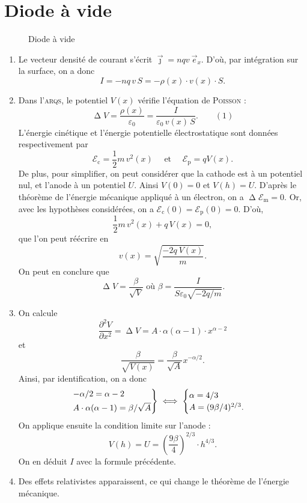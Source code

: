 \section{Diode à vide}

\begin{figure}[H]
	\centering
	
	\caption{Diode à vide}
\end{figure}

\begin{enumerate}
	\item Le vecteur densité de courant s'écrit $\vec{\jmath} = n q v\: \vec{e}_x$. D'où, par intégration sur la surface, on a donc \[
			I =  -nq\, v\, S = -\rho(x) \cdot v(x) \cdot S
		.\]
	\item Dans l'\textsc{arqs}, le potentiel $V(x)$ vérifie l'équation de \textsc{Poisson} : \[
			\upDelta V = \frac{\rho(x)}{\varepsilon_0} = \frac{I}{\varepsilon_0\, v(x)\, S}.\quad\quad(1)
		\] L'énergie cinétique et l'énergie potentielle électrostatique sont données respectivement par \[
			\mathcal{E}_\mathrm{c}  = \frac{1}{2} m \,v^2(x) \quad \text{ et } \quad \mathcal{E}_\mathrm{p} = q V(x)	
		.\]
		De plus, pour simplifier, on peut considérer que la cathode est à un potentiel nul, et l'anode à un potentiel $U$. Ainsi $V(0) = 0$ et $V(h) = U$.
		D'après le théorème de l'énergie mécanique appliqué à un électron, on a $\upDelta \mathcal{E}_\mathrm{m} = 0$.
		Or, avec les hypothèses considérées, on a $\mathcal{E}_\mathrm{c}(0) = \mathcal{E}_\mathrm{p} (0) = 0$.
		D'où, \[
			\frac{1}{2} m\,v^2(x) + q\,V(x) = 0
		,\] que l'on peut réécrire en \[
			v(x) = \sqrt{\frac{-2q\:V(x)}{m}}
		.\] On peut en conclure que \[
			\boxed{\upDelta V = \frac{\beta}{\sqrt{V}}} \text{ où } \beta = \frac{I}{S \varepsilon_0 \sqrt{ - 2q / m}}
		.\]
	\item On calcule \[
			\frac{\partial^2 V}{\partial x^2} = \upDelta V = A \cdot \alpha(\alpha-1) \cdot x^{\alpha-2}
		\] et \[
			\frac{\beta}{\sqrt{V(x)}} = \frac{\beta}{\sqrt{A}} x^{-\alpha / 2}
		.\]
		Ainsi, par identification, on a donc \[
			\begin{rcases*}
				-\alpha / 2 = \alpha - 2\\
				A \cdot \alpha(\alpha-1) = \beta / \sqrt{A}
			\end{rcases*} \iff \begin{cases}
				\alpha = 4 / 3\\
				A = (9 \beta / 4)^{2 / 3}.
			\end{cases}
		\]On applique ensuite la condition limite sur l'anode : \[
			V(h) = U = \left( \frac{9 \beta}{4} \right)^{2 / 3} \cdot h^{4 / 3}
		.\]
		On en déduit $I$ avec la formule précédente.
	\item Des effets relativistes apparaissent, ce qui change le théorème de l'énergie mécanique.
\end{enumerate}
